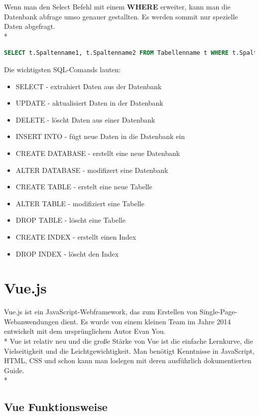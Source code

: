 Wenn man den Select Befehl mit einem \textbf{WHERE} erweiter, kann man die Datenbank abfrage umso genauer gestallten. Es werden sommit nur spezielle Daten abgefragt. \\*

\begin{lstlisting}[language=SQL,caption=Sql Select Where,label=lst:impl:foo]
SELECT t.Spaltenname1, t.Spaltenname2 FROM Tabellenname t WHERE t.Spaltenname1 = 1
\end{lstlisting}


Die wichtigsten SQL-Comands lauten:
\begin{itemize}
  \item SELECT - extrahiert Daten aus der Datenbank
  \item UPDATE - aktualisiert Daten in der Datenbank
  \item DELETE - löscht Daten aus einer Datenbank
  \item INSERT INTO - fügt neue Daten in die Datenbank ein
  \item CREATE DATABASE - erstellt eine neue Datenbank
  \item ALTER DATABASE - modifizert eine Datenbank
  \item CREATE TABLE - erstelt eine neue Tabelle
  \item ALTER TABLE - modifiziert eine Tabelle
  \item DROP TABLE - löscht eine Tabelle
  \item CREATE INDEX - erstellt einen Index
  \item DROP INDEX - löscht den Index
\end{itemize}

\section{Vue.js}
\author{Benjamin Besic}
Vue.js ist ein JavaScript-Webframework, das zum Erstellen von Single-Page-Webanwendungen dient. 
Es wurde von einem kleinen Team im Jahre 2014 entwickelt mit dem ursprünglichem Autor Evan You.\\* Vue ist relativ neu und die große Stärke
von Vue ist die einfache Lernkurve, die Vielseitigkeit und die Leichtgewichtigkeit. Man benötigt Kenntnisse in JavaScript, HTML, CSS und schon kann man loslegen
mit deren ausführlich dokumentierten Guide\cite{VueGuide}. \cite{VueWissen} \cite{VueWiki}\\*

\subsection{Vue Funktionsweise}

